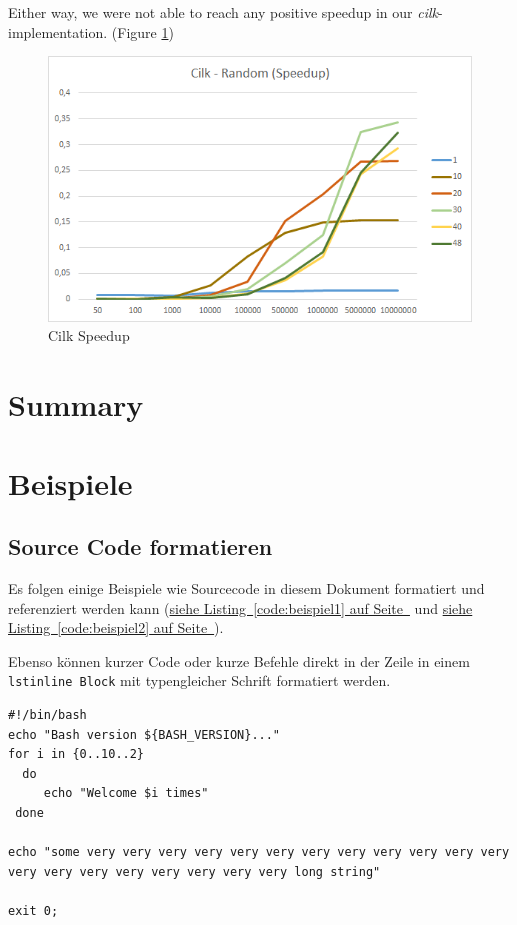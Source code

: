 \documentclass[12pt,a4paper,titlepage,oneside]{scrartcl}
\begin{document}
Either way, we were not able to reach any positive speedup in our \textit{cilk}-implementation. (Figure \ref{fig:saturn_cilk_speedup_random})

\begin{figure}[h]
\includegraphics[width=\linewidth]{Saturn_Cilk_Speedup_Random}
\caption{Cilk Speedup}
\label{fig:saturn_cilk_speedup_random}
\end{figure}

\section{Summary}


\section{Beispiele}
\subsection{Source Code formatieren}
Es folgen einige Beispiele wie Sourcecode in diesem Dokument formatiert und referenziert werden kann
(\hyperref[code:beispiel1]{siehe Listing~\ref*{code:beispiel1} auf Seite~\pageref*{code:beispiel1}} und \hyperref[code:beispiel2]{siehe Listing~\ref*{code:beispiel2} auf Seite~\pageref*{code:beispiel2}}).

Ebenso können kurzer Code oder kurze Befehle direkt in der Zeile in einem \lstinline{lstinline Block} mit typengleicher Schrift formatiert werden.



\begin{lstlisting}[caption=Example bash script,label=code:beispiel2,style=simple]
#!/bin/bash
echo "Bash version ${BASH_VERSION}..."
for i in {0..10..2}
  do
     echo "Welcome $i times"
 done

echo "some very very very very very very very very very very very very very very very very very very very very long string"

exit 0;
\end{lstlisting}
\end{document}
